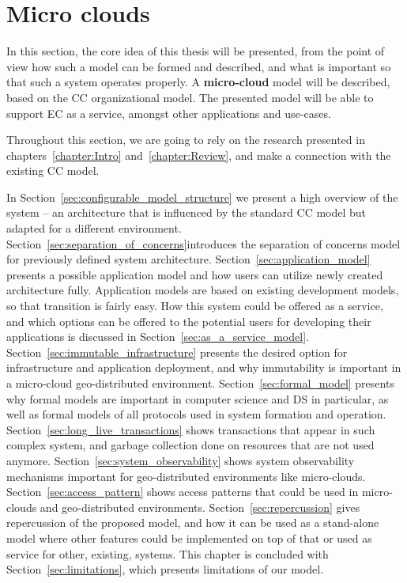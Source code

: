 \chapter{Micro clouds}\label{chapter:Micro_clouds}
%
In this section, the core idea of this thesis will be presented, from the point of view how such a model can be formed and described, and what is important so that such a system operates properly. A \textbf{micro-cloud} model will be described, based on the CC organizational model.  The presented model will be able to support EC as a service, amongst other applications and use-cases. 

Throughout this section, we are going to rely on the research presented in chapters~\ref{chapter:Intro} and~\ref{chapter:Review}, and make a connection with the existing CC model.

In Section~\ref{sec:configurable_model_structure} we present a high overview of the system -- an architecture that is influenced by the standard CC model but adapted for a different environment. Section~\ref{sec:separation_of_concerns}introduces the separation of concerns model for previously defined system architecture. Section~\ref{sec:application_model} presents a possible application model and how users can utilize newly created architecture fully. Application models are based on existing development models, so that transition is fairly easy. How this system could be offered as a service, and which options can be offered to the potential users for developing their applications is discussed in Section~\ref{sec:as_a_service_model}. Section~\ref{sec:immutable_infrastructure} presents the desired option for infrastructure and application deployment, and why immutability is important in a micro-cloud geo-distributed environment. Section~\ref{sec:formal_model} presents why formal models are important in computer science and DS in particular, as well as formal models of all protocols used in system formation and operation.  Section~\ref{sec:long_live_transactions} shows transactions that appear in such complex system, and garbage collection done on resources that are not used anymore. Section~\ref{sec:system_observability} shows system observability mechanisms important for geo-distributed environments like micro-clouds. Section~\ref{sec:access_pattern} shows access patterns that could be used in micro-clouds and geo-distributed environments. Section~\ref{sec:repercussion} gives repercussion of the proposed model, and how it can be used as a stand-alone model where other features could be implemented on top of that or used as service for other, existing, systems. This chapter is concluded with Section~\ref{sec:limitations}, which presents limitations of our model.
%
%
